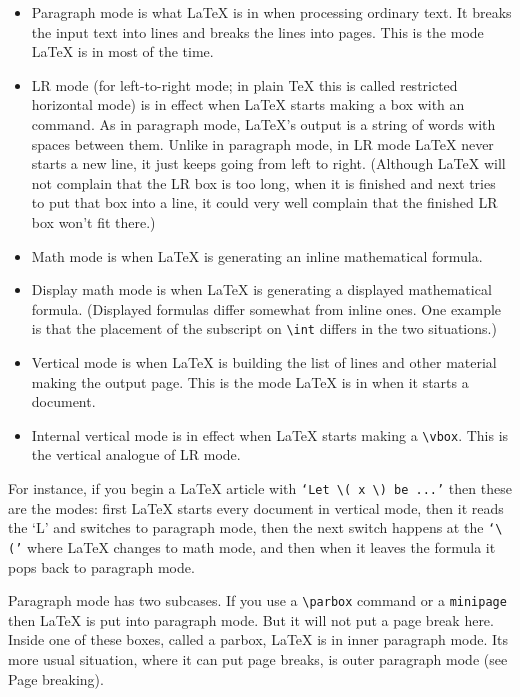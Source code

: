 \documentclass{article}
\begin{document}
\begin{itemize}
   \item Paragraph mode is what \LaTeX{} is in when processing ordinary text. It breaks the input text into lines and breaks the lines into pages. This is the mode \LaTeX{} is in most of the time.

   \item LR mode (for left-to-right mode; in plain TeX this is called restricted horizontal mode) is in effect when \LaTeX{} starts making a box with an \mbox command. As in paragraph mode,
     LaTeX’s output is a string of words with spaces between them. Unlike in paragraph mode, in LR mode \LaTeX{} never starts a new line, it just keeps going from left to right.
     (Although \LaTeX{} will not complain that the LR box is too long, when it is finished and next tries to put that box into a line, it could very well complain that the finished LR box
     won’t fit there.)

   \item Math mode is when \LaTeX{} is generating an inline mathematical formula.

   \item Display math mode is when \LaTeX{} is generating a displayed mathematical formula. (Displayed formulas differ somewhat from inline ones. One example is that the placement
     of the subscript on \verb!\int!  differs in the two situations.)

  \item  Vertical mode is when \LaTeX{} is building the list of lines and other material making the output page. This is the mode \LaTeX{} is in when it starts a document.

   \item Internal vertical mode is in effect when \LaTeX{} starts making a \verb!\vbox!. This is the vertical analogue of LR mode.
\end{itemize}
For instance, if you begin a \LaTeX{} article with \verb!‘Let \( x \) be ...’! then these are the modes: first \LaTeX{} starts every document in vertical mode, then it reads the ‘L’ and switches to paragraph mode, then the next switch happens at the \verb!‘\(’! where \LaTeX{} changes to math mode, and then when it leaves the formula it pops back to paragraph mode.

Paragraph mode has two subcases. If you use a \verb!\parbox! command or a \verb!minipage! then \LaTeX{} is put into paragraph mode. But it will not put a page break here. Inside one of these boxes, called a parbox, \LaTeX{} is in inner paragraph mode. Its more usual situation, where it can put page breaks, is outer paragraph mode (see Page breaking).
\end{document}
